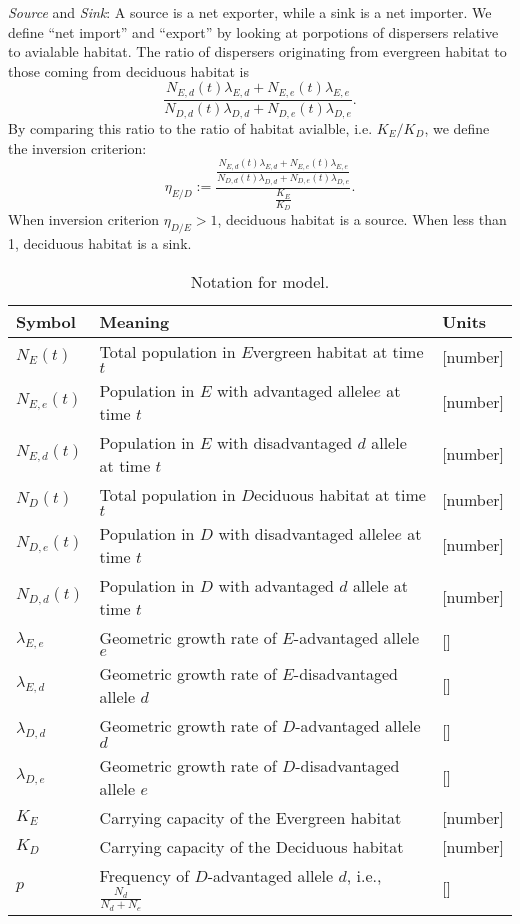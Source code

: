 \documentclass[11pt, reqno]{amsart}
\begin{document}
{\em Source} and {\em Sink}: A source is a net exporter, while a sink is a net importer. 
We define ``net import'' and ``export'' by looking at porpotions of dispersers  relative to avialable habitat. 
The ratio of dispersers originating from evergreen habitat to those coming from deciduous habitat is
  \begin{equation}\label{E:rat}
      \frac{ N_{E,d}(t)\lambda_{E,d}+ N_{E,e}(t)\lambda_{E,e}}{N_{D,d}(t)\lambda_{D,d}+N_{D,e}(t)\lambda_{D,e}}.
 \end{equation}
By comparing this ratio to the ratio of habitat avialble, i.e. $K_E/K_D$, we define the inversion criterion:
  \begin{equation}\label{E:invers}
   \eta_{E/D} := \frac{ \frac{ N_{E,d}(t)\lambda_{E,d}+ N_{E,e}(t)\lambda_{E,e}}{N_{D,d}(t)\lambda_{D,d}+N_{D,e}(t)\lambda_{D,e}}}{\frac {K_E}{K_D}}.
 \end{equation}
When inversion criterion $\eta_{D/E} > 1$, deciduous habitat is a source. When less than 1, deciduous habitat is a sink.


\begin{spacing}{1}
\begin{table}
  \renewcommand*\arraystretch{.9}
  \caption{Notation for model.}\label{T:one}
  \centering
  \begin{tabular} {@{}lp{}l@{}}
    \toprule
    Symbol &Meaning &Units\\     
    \midrule 
    $N_E(t)$ &Total population in $E$vergreen habitat at time $t$ &[number]\\    
    $N_{E,e}(t)$ &Population in $E$ with advantaged allele$e$ at time $t$ &[number]\\    
    $N_{E,d}(t)$ &Population in $E$ with disadvantaged $d$ allele at time $t$ &[number]\\    
   $N_D(t)$ &Total population in $D$eciduous habitat at time $t$ &[number]\\
    $N_{D,e}(t)$ &Population in $D$ with disadvantaged allele$e$ at time $t$ &[number]\\    
    $N_{D,d}(t)$ &Population in $D$ with advantaged $d$ allele at time $t$ &[number]\\    
   $\lambda_{E,e}$ &Geometric growth rate of $E$-advantaged allele $e$&[]\\
   $\lambda_{E,d}$ &Geometric growth rate of $E$-disadvantaged allele $d$&[]\\
   $\lambda_{D,d}$ &Geometric growth rate of $D$-advantaged allele $d$&[]\\
   $\lambda_{D,e}$ &Geometric growth rate of $D$-disadvantaged allele $e$&[]\\
   $K_E$ &Carrying capacity of the Evergreen habitat&[number]\\
   $K_D$ &Carrying capacity of the Deciduous habitat&[number]\\
   $p$      & Frequency of $D$-advantaged allele $d$, i.e., $\frac{N_d}{N_d + N_e}$ &[]\\
    \bottomrule
  \end{tabular}
\end{table}

\end{spacing}
\end{document}
